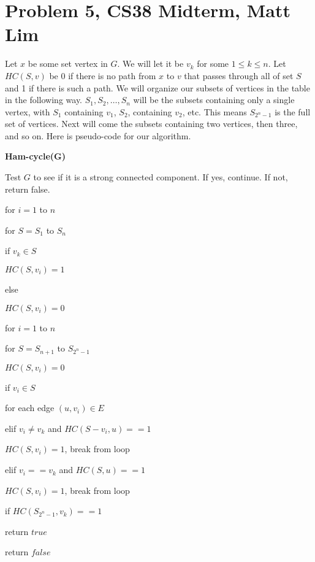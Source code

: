 \documentclass{article}
\begin{document}
\section*{Problem 5, CS38 Midterm, Matt Lim}
Let $x$ be some set vertex in $G$. We will let it be $v_k$ for some
$1 \le k \le n$. Let $HC(S,v)$ be 0 if there is no path from $x$ to $v$ that
passes through all of set $S$ and 1 if there is such a path. We will organize
our subsets of vertices in the table in the following way. $S_1, S_2, \dots,
S_n$ will be the subsets containing only a single vertex, with $S_1$ containing
$v_1$, $S_2$, containing $v_2$, etc. This means $S_{2^n - 1}$ is the full set
of vertices. Next will come the subsets containing two
vertices, then three, and so on.
Here is pseudo-code for our algorithm.

\vspace{5mm}
\noindent \textbf{Ham-cycle(G)}
\begin{enumerate}
    \item Test $G$ to see if it is a strong connected component. If yes,
        continue. If not, return false.
    \item for $i=1$ to $n$
    {\setlength\itemindent{25pt} \item for $S = S_1$ to $S_n$ }
    {\setlength\itemindent{50pt} \item if $v_k \in S$ }
    {\setlength\itemindent{75pt} \item $HC(S,v_i) = 1$ }
    {\setlength\itemindent{50pt} \item else }
    {\setlength\itemindent{75pt} \item $HC(S,v_i) = 0$ }
    \item for $i=1$ to $n$
    {\setlength\itemindent{25pt} \item for $S = S_{n+1}$ to $S_{2^n - 1}$ }
    {\setlength\itemindent{50pt} \item $HC(S,v_i) = 0$ }
    {\setlength\itemindent{50pt} \item if $v_i \in S$ }
    {\setlength\itemindent{75pt} \item for each edge $(u,v_i) \in E$ }
    {\setlength\itemindent{100pt} \item elif $v_i \neq v_k$ and $HC(S-v_i, u) == 1$ }
    {\setlength\itemindent{125pt} \item $HC(S, v_i) = 1$, break from loop }
    {\setlength\itemindent{100pt} \item elif $v_i == v_k$ and $HC(S, u) == 1$ }
    {\setlength\itemindent{125pt} \item $HC(S, v_i) = 1$, break from loop }
    \item if $HC(S_{2^n - 1}, v_k) == 1$
    {\setlength\itemindent{25pt} \item return $true$ }
    \item return $false$
\end{enumerate}
\end{document}

